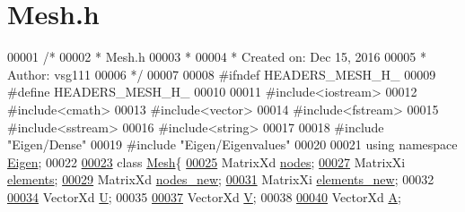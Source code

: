 \hypertarget{_mesh_8h_source}{}\section{Mesh.\+h}
\label{_mesh_8h_source}

\begin{DoxyCode}
00001 \textcolor{comment}{/*}
00002 \textcolor{comment}{ * Mesh.h}
00003 \textcolor{comment}{ *}
00004 \textcolor{comment}{ *  Created on: Dec 15, 2016}
00005 \textcolor{comment}{ *      Author: vsg111}
00006 \textcolor{comment}{ */}
00007 
00008 \textcolor{preprocessor}{#ifndef HEADERS\_MESH\_H\_}
00009 \textcolor{preprocessor}{#define HEADERS\_MESH\_H\_}
00010 
00011 \textcolor{preprocessor}{#include<iostream>}
00012 \textcolor{preprocessor}{#include<cmath>}
00013 \textcolor{preprocessor}{#include<vector>}
00014 \textcolor{preprocessor}{#include<fstream>}
00015 \textcolor{preprocessor}{#include<sstream>}
00016 \textcolor{preprocessor}{#include<string>}
00017 
00018 \textcolor{preprocessor}{#include "Eigen/Dense"}
00019 \textcolor{preprocessor}{#include "Eigen/Eigenvalues"}
00020 
00021 \textcolor{keyword}{using namespace }\hyperlink{namespace_eigen}{Eigen};
00022 
\hyperlink{class_mesh}{00023} \textcolor{keyword}{class }\hyperlink{class_mesh}{Mesh}\{
\hyperlink{class_mesh_aa143447b8630a7a8bf2b045fddf372c3}{00025}     MatrixXd \hyperlink{class_mesh_aa143447b8630a7a8bf2b045fddf372c3}{nodes};
\hyperlink{class_mesh_a32aed9620eeb7eaf93a3f8c8f6e79bde}{00027}     MatrixXi \hyperlink{class_mesh_a32aed9620eeb7eaf93a3f8c8f6e79bde}{elements};
\hyperlink{class_mesh_aa9cae59f50d13339ed395ef567401cb8}{00029}     MatrixXd \hyperlink{class_mesh_aa9cae59f50d13339ed395ef567401cb8}{nodes\_new};
\hyperlink{class_mesh_a8e099460dded463a5c13fb8d6066d312}{00031}     MatrixXi \hyperlink{class_mesh_a8e099460dded463a5c13fb8d6066d312}{elements\_new};
00032 
\hyperlink{class_mesh_a950948f115bf07df771fa277042eedc1}{00034}     VectorXd \hyperlink{class_mesh_a950948f115bf07df771fa277042eedc1}{U};
00035 
\hyperlink{class_mesh_a69a99942ef6672d74a7ba569bdbd3c83}{00037}     VectorXd \hyperlink{class_mesh_a69a99942ef6672d74a7ba569bdbd3c83}{V};
00038 
\hyperlink{class_mesh_ae7202a4f96820433c69bc2ea4cc1b31d}{00040}     VectorXd \hyperlink{class_mesh_ae7202a4f96820433c69bc2ea4cc1b31d}{A};

\end{DoxyCode}
